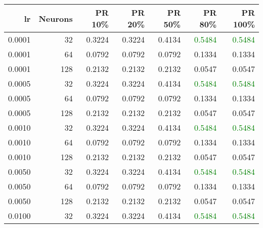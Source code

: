\begin{tabular}{rrrrrrr}
\toprule
lr & Neurons & PR 10\% & PR 20\% & PR 50\% & PR 80\% & PR 100\% \\
\midrule
0.0001 & 32 & \textcolor{blu} {0.3224} & \textcolor{blu} {0.3224} & \textcolor{blu} {0.4134} & \textcolor{green} {0.5484} & \textcolor{green} {0.5484} \\
0.0001 & 64 & \textcolor{blu} {0.0792} & \textcolor{blu} {0.0792} & \textcolor{blu} {0.0792} & \textcolor{blu} {0.1334} & \textcolor{blu} {0.1334} \\
0.0001 & 128 & \textcolor{blu} {0.2132} & \textcolor{blu} {0.2132} & \textcolor{blu} {0.2132} & \textcolor{blu} {0.0547} & \textcolor{blu} {0.0547} \\
0.0005 & 32 & \textcolor{blu} {0.3224} & \textcolor{blu} {0.3224} & \textcolor{blu} {0.4134} & \textcolor{green} {0.5484} & \textcolor{green} {0.5484} \\
0.0005 & 64 & \textcolor{blu} {0.0792} & \textcolor{blu} {0.0792} & \textcolor{blu} {0.0792} & \textcolor{blu} {0.1334} & \textcolor{blu} {0.1334} \\
0.0005 & 128 & \textcolor{blu} {0.2132} & \textcolor{blu} {0.2132} & \textcolor{blu} {0.2132} & \textcolor{blu} {0.0547} & \textcolor{blu} {0.0547} \\
0.0010 & 32 & \textcolor{blu} {0.3224} & \textcolor{blu} {0.3224} & \textcolor{blu} {0.4134} & \textcolor{green} {0.5484} & \textcolor{green} {0.5484} \\
0.0010 & 64 & \textcolor{blu} {0.0792} & \textcolor{blu} {0.0792} & \textcolor{blu} {0.0792} & \textcolor{blu} {0.1334} & \textcolor{blu} {0.1334} \\
0.0010 & 128 & \textcolor{blu} {0.2132} & \textcolor{blu} {0.2132} & \textcolor{blu} {0.2132} & \textcolor{blu} {0.0547} & \textcolor{blu} {0.0547} \\
0.0050 & 32 & \textcolor{blu} {0.3224} & \textcolor{blu} {0.3224} & \textcolor{blu} {0.4134} & \textcolor{green} {0.5484} & \textcolor{green} {0.5484} \\
0.0050 & 64 & \textcolor{blu} {0.0792} & \textcolor{blu} {0.0792} & \textcolor{blu} {0.0792} & \textcolor{blu} {0.1334} & \textcolor{blu} {0.1334} \\
0.0050 & 128 & \textcolor{blu} {0.2132} & \textcolor{blu} {0.2132} & \textcolor{blu} {0.2132} & \textcolor{blu} {0.0547} & \textcolor{blu} {0.0547} \\
0.0100 & 32 & \textcolor{blu} {0.3224} & \textcolor{blu} {0.3224} & \textcolor{blu} {0.4134} & \textcolor{green} {0.5484} & \textcolor{green} {0.5484} \\

\end{tabular}
